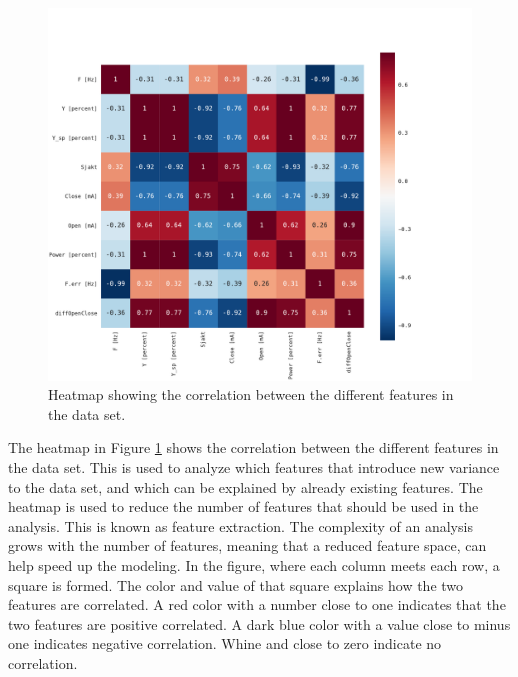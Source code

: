        \begin{figure}
            \centering
            \includegraphics[width = \textwidth]{figures/data/heatmap.pdf}
            \caption{Heatmap showing the correlation between the different features in the data set.}
            \label{fig:heatmap}
        \end{figure}
    
        The heatmap in Figure \ref{fig:heatmap} shows the correlation between the different features in the data set. This is used to analyze which features that introduce new variance to the data set, and which can be explained by already existing features. The heatmap  is used to reduce the number of features that should be used in the analysis. This is known as feature extraction. The complexity of an analysis grows with the number of features, meaning that a reduced feature space, can help speed up the modeling. In the figure, where each column meets each row, a square is formed. The color and value of that square explains how the two features are correlated. A red color with a number close to one indicates that the two features are positive correlated. A dark blue color with a value close to minus one indicates negative correlation. Whine and close to zero indicate no correlation.  
        
